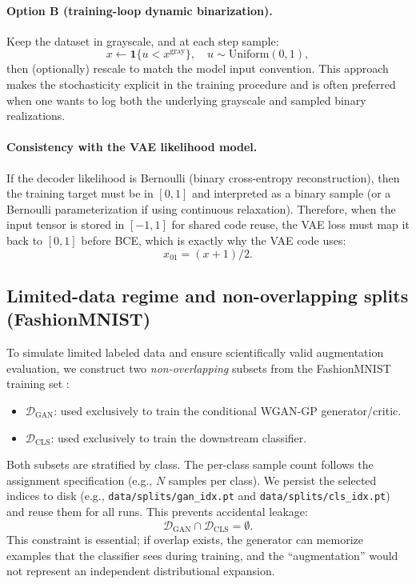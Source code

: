 \paragraph{Option B (training-loop dynamic binarization).}
Keep the dataset in grayscale, and at each step sample:
\[
x \leftarrow \mathbf{1}\{u < x^{\mathrm{gray}}\},\quad u\sim \mathrm{Uniform}(0,1),
\]
then (optionally) rescale to match the model input convention. This approach makes the stochasticity explicit in the training procedure and is often preferred when one wants to log both the underlying grayscale and sampled binary realizations.

\paragraph{Consistency with the VAE likelihood model.}
If the decoder likelihood is Bernoulli (binary cross-entropy reconstruction), then the training target must be in $[0,1]$ and interpreted as a binary sample (or a Bernoulli parameterization if using continuous relaxation). Therefore, when the input tensor is stored in $[-1,1]$ for shared code reuse, the VAE loss must map it back to $[0,1]$ before BCE, which is exactly why the VAE code uses:
\[
x_{01} = (x + 1)/2.
\]

\subsection{Limited-data regime and non-overlapping splits (FashionMNIST)}
\label{subsec:limited_data_splits}
To simulate limited labeled data and ensure scientifically valid augmentation evaluation, we construct two \emph{non-overlapping} subsets from the FashionMNIST training set \cite{Xiao2017FashionMNIST}:
\begin{itemize}
  \item $\mathcal{D}_{\mathrm{GAN}}$: used exclusively to train the conditional WGAN-GP generator/critic.
  \item $\mathcal{D}_{\mathrm{CLS}}$: used exclusively to train the downstream classifier.
\end{itemize}
Both subsets are stratified by class. The per-class sample count follows the assignment specification (e.g., $N$ samples per class). We persist the selected indices to disk (e.g., \texttt{data/splits/gan\_idx.pt} and \texttt{data/splits/cls\_idx.pt}) and reuse them for all runs. This prevents accidental leakage:
\[
\mathcal{D}_{\mathrm{GAN}} \cap \mathcal{D}_{\mathrm{CLS}} = \emptyset.
\]
This constraint is essential; if overlap exists, the generator can memorize examples that the classifier sees during training, and the ``augmentation'' would not represent an independent distributional expansion.

